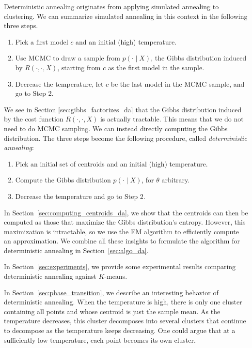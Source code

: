 Deterministic annealing originates from applying simulated annealing to
clustering. We can summarize simulated annealing in this context in the
following three steps.

\begin{enumerate}
\item Pick a first model $c$ and an initial (high) temperature.
\item Use MCMC to draw a sample from $p(\cdot \mid X)$, the Gibbs distribution induced by $R(\cdot, \cdot, X)$, starting from $c$ as the first model in the sample.
\item Decrease the temperature, let $c$ be the last model in the MCMC
sample, and go to Step 2.
\end{enumerate}

We see in Section \ref{sec:gibbs_factorizes_da} that the Gibbs distribution induced by the cost
function $R(\cdot, \cdot, X)$ is actually tractable. This means that we do not need to do MCMC sampling. We can instead directly computing the Gibbs distribution. The three steps become the following procedure, called \emph{deterministic annealing}:
%
\begin{enumerate}
\item Pick an initial set of centroids and an initial (high) temperature.
\item Compute the Gibbs distribution $p(\cdot \mid X)$, for $\theta$ arbitrary.
\item Decrease the temperature and go to Step 2.
\end{enumerate}
%
In Section~\ref{sec:computing_centroids_da}, we show that the centroids can then be computed as those that maximize the Gibbs distribution's entropy. However, this maximization is intractable, so we use the EM algorithm to efficiently compute an approximation. We combine all these insights to formulate the algorithm for deterministic annealing in Section~\ref{sec:algo_da}.

In Section~\ref{sec:experiments}, we provide some experimental results comparing deterministic annealing against $K$-means. 

In Section~\ref{sec:phase_transition}, we describe an interesting behavior of deterministic annealing.
When the temperature is high, there is only one cluster containing
all points and whose centroid is just the sample mean. As the temperature
decreases, this cluster decomposes into several clusters that continue
to decompose as the temperature keeps decreasing. One could argue that
at a sufficiently low temperature, each point becomes its own cluster.

